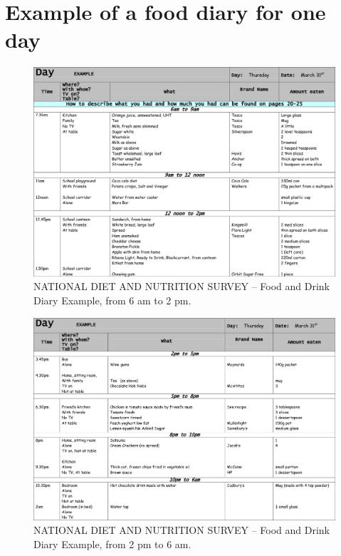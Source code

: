 
\chapter{Example of a food diary for one day} %


\label{AppendixC} %

\begin{figure}[H]
\centering
\includegraphics{Figures/Diary1.png}
\decoRule
\caption[One day food diary example 6 am to 2 pm]{NATIONAL DIET AND NUTRITION SURVEY -- Food and Drink Diary Example, from 6 am to 2 pm.}
\label{fig:diary1}
\end{figure}

\begin{figure}[H]
\centering
\includegraphics{Figures/Diary2.png}
\decoRule
\caption[One day food diary example 2 pm to 6 am]{NATIONAL DIET AND NUTRITION SURVEY -- Food and Drink Diary Example, from 2 pm to 6 am.}
\label{fig:diary2}
\end{figure}


